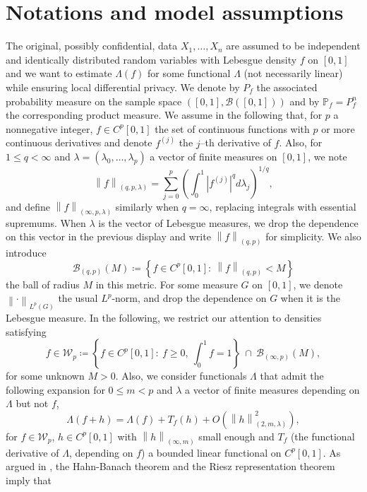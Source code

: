 \documentclass[preprint]{imsart}
\renewcommand{\P}{\mathbb{P}}
\newcommand\norm[1]{\left\lVert#1\right\rVert}
\numberwithin{equation}{section}
\begin{document}
\section{Notations and model assumptions}
\label{sec:Model}

The original, possibly confidential, data $X_1,\dots,X_n$ are assumed to be independent and identically distributed random variables with Lebesgue density $f$ on $[0,1]$ and we want to estimate $\Lambda(f)$ for some functional $\Lambda$ (not necessarily linear) while ensuring local differential privacy. We denote by $P_f$ the associated probability measure on the sample space $([0,1],\mathcal B([0,1]))$ and by $\P_f = P_f^n$ the corresponding product measure. We assume in the following that, for $p$ a nonnegative integer, $f\in C^p[0,1]$ the set of continuous functions with $p$ or more continuous derivatives and denote $f^{(j)}$ the $j$--th derivative of $f$. Also, for $1\leq q<\infty$ and $\lambda=(\lambda_0,\dots,\lambda_p)$ a vector of finite measures on $[0,1]$, we note
\[ \norm{f}_{(q,p,\lambda)} = \sum_{j=0}^p \left(\int_0^1 |f^{(j)}|^q d\lambda_j\right)^{1/q},\]
and define $\norm{f}_{(\infty,p,\lambda)}$ similarly when $q=\infty$, replacing integrals with essential supremums. When $\lambda$ is the vector of Lebesgue measures, we drop the dependence on this vector in the previous display and write $\norm{f}_{(q,p)}$ for simplicity. We also introduce \[\mathcal{B}_{(q,p)}(M)\coloneqq \left\{f\in C^p[0,1]\colon\ \norm{f}_{(q,p)}<M\right\}\] the ball of radius $M$ in this metric. For some measure $G$ on $[0,1]$, we denote $\norm{\cdot}_{L^p(G)}$ the usual $L^p$-norm, and drop the dependence on $G$ when it is the Lebesgue measure. In the following, we restrict our attention to densities satisfying
\begin{equation}\label{eq: func space} f\in \mathcal{W}_p\coloneqq \left\{f\in C^p[0,1]:\ f\geq0,\ \int_0^1f=1\right\}\ \cap \ \mathcal{B}_{(\infty,p)}(M),\end{equation}
for some unknown $M>0$.
Also, we consider functionals $\Lambda$ that admit the following expansion for $0\leq m<p$ and $\lambda$ a vector of finite measures depending on $\Lambda$ but not $f$, 
\begin{equation}\label{eq: form functional}
    \Lambda(f+h) = \Lambda(f) + T_f(h) + O(\norm{h}^2_{(2,m,\lambda)}),
\end{equation}
for $f\in \mathcal{W}_p$, $h\in C^p[0,1]$ with $\norm{h}_{(\infty,m)}$ small enough and $T_f$ (the functional derivative of $\Lambda$, depending on $f$) a bounded linear functional on $C^p[0,1]$. As argued in \cite{GoldsteinMesser92}, the Hahn-Banach theorem and the Riesz representation theorem imply that
\end{document}
